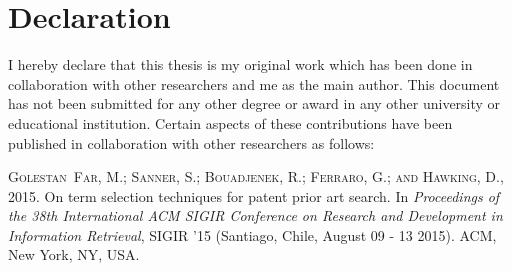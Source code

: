 \chapter*{Declaration}
\vspace{-1em}
I hereby declare that this thesis is my original work which has been done in 
collaboration with other researchers and me as the main author. This document has
not been submitted for any other degree or award in any other university or educational 
institution. 
Certain aspects of these contributions have been published in 
collaboration with other researchers as follows:
\begin{itemize}
\textsc{Golestan~Far, M.; Sanner, S.; Bouadjenek, R.; Ferraro, G.; and Hawking,
  D.}, 2015.
\newblock On term selection techniques for patent prior art search.
\newblock In \emph{Proceedings of the 38th International ACM SIGIR Conference
  on Research and Development in Information Retrieval}, SIGIR '15 (Santiago,
  Chile, August 09 - 13 2015). ACM, New York, NY, USA.



\end{itemize}


